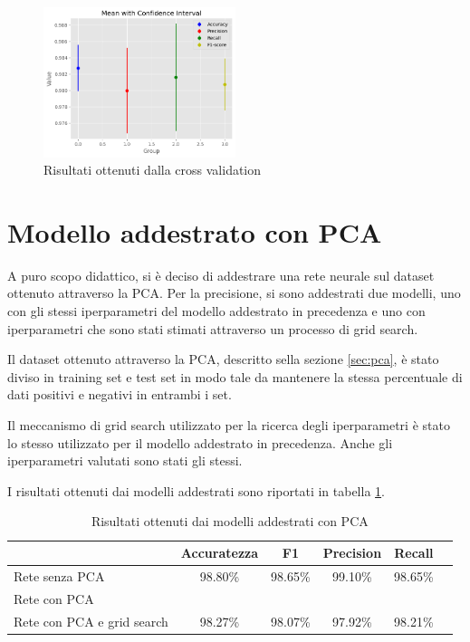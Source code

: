 \begin{figure}[!ht]
    \centering
    \includegraphics[width=0.5\textwidth]{img/rete/intervalli_confidenza.png}
    \caption{Risultati ottenuti dalla cross validation}
    \label{fig:risultatiCrossValidation}
\end{figure}
\section{Modello addestrato con PCA}
A puro scopo didattico, si è deciso di addestrare una rete neurale sul dataset
ottenuto attraverso la PCA. Per la precisione, si sono addestrati due modelli,
uno con gli stessi iperparametri del modello addestrato in precedenza e uno con
iperparametri che sono stati stimati attraverso un processo di grid search.

Il dataset ottenuto attraverso la PCA, descritto sella sezione \ref{sec:pca}, è
stato diviso in training set e test set in modo tale da mantenere la stessa
percentuale di dati positivi e negativi in entrambi i set.

Il meccanismo di grid search utilizzato per la ricerca degli iperparametri è
stato lo stesso utilizzato per il modello addestrato in precedenza. Anche
gli iperparametri valutati sono stati gli stessi.

I risultati ottenuti dai modelli addestrati sono riportati in tabella
\ref{tab:risultatiReteNeuralePCA}.

\begin{table}[ht]
    \centering
    \begin{tabular}{@{}lccccc@{}}
        \toprule
        \rowcolor[HTML]{EFEFEF}
        \multicolumn{1}{c}{\cellcolor[HTML]{EFEFEF}\textbf{Modello}} & \textbf{Accuratezza} & \textbf{F1} & \textbf{Precision} & \textbf{Recall} \\ \midrule
        Rete senza PCA                                               & 98.80\%              & 98.65\%     & 99.10\%            & 98.65\%         \\
        Rete con PCA                                                 &                      &             &                    &                 \\
        Rete con PCA e grid search                                   & 98.27\%              & 98.07\%     & 97.92\%            & 98.21\%         \\ \bottomrule
    \end{tabular}
    \caption{Risultati ottenuti dai modelli addestrati con PCA}
    \label{tab:risultatiReteNeuralePCA}
\end{table}

